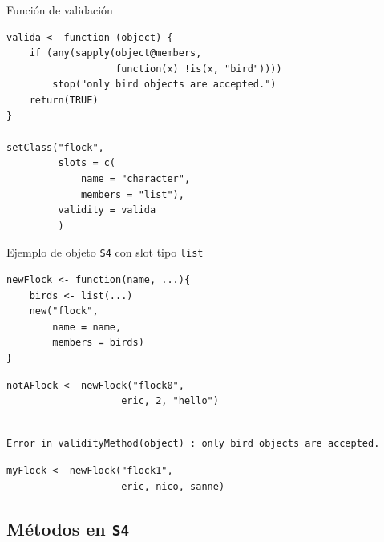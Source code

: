 \documentclass[xcolor={usenames,svgnames,dvipsnames}]{beamer}
\begin{document}
\begin{frame}[label={sec:orgce103b3},fragile]{Función de validación}
 \lstset{language=r,label= ,caption= ,captionpos=b,numbers=none}
\begin{lstlisting}
valida <- function (object) {
    if (any(sapply(object@members,
                   function(x) !is(x, "bird")))) 
        stop("only bird objects are accepted.")
    return(TRUE)
}

setClass("flock",
         slots = c(
             name = "character",
             members = "list"),
         validity = valida
         )
\end{lstlisting}
\end{frame}

\begin{frame}[label={sec:org1b50b83},fragile]{Ejemplo de objeto \texttt{S4} con slot tipo \texttt{list}}
 \lstset{language=r,label= ,caption= ,captionpos=b,numbers=none}
\begin{lstlisting}
newFlock <- function(name, ...){
    birds <- list(...)
    new("flock",
        name = name,
        members = birds)
}
\end{lstlisting}

\lstset{language=r,label= ,caption= ,captionpos=b,numbers=none}
\begin{lstlisting}
notAFlock <- newFlock("flock0",
                    eric, 2, "hello")
\end{lstlisting}

\begin{verbatim}

Error in validityMethod(object) : only bird objects are accepted.
\end{verbatim}


\lstset{language=r,label= ,caption= ,captionpos=b,numbers=none}
\begin{lstlisting}
myFlock <- newFlock("flock1",
                    eric, nico, sanne)
\end{lstlisting}
\end{frame}

\subsection{Métodos en \texttt{S4}}
\label{sec:orgaba1087}
\end{document}
